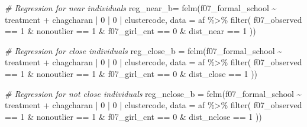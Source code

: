 \documentclass[
]{article}
\newenvironment{Shaded}{\begin{snugshade}}{\end{snugshade}}
\newcommand{\AttributeTok}[1]{\textcolor[rgb]{0.77,0.63,0.00}{#1}}
\newcommand{\CommentTok}[1]{\textcolor[rgb]{0.56,0.35,0.01}{\textit{#1}}}
\newcommand{\DecValTok}[1]{\textcolor[rgb]{0.00,0.00,0.81}{#1}}
\newcommand{\FunctionTok}[1]{\textcolor[rgb]{0.00,0.00,0.00}{#1}}
\newcommand{\NormalTok}[1]{#1}
\newcommand{\OtherTok}[1]{\textcolor[rgb]{0.56,0.35,0.01}{#1}}
\newcommand{\SpecialCharTok}[1]{\textcolor[rgb]{0.00,0.00,0.00}{#1}}
\begin{document}
\begin{Shaded}
\begin{Highlighting}[]
\CommentTok{\# Regression for near individuals}
\NormalTok{reg\_near\_b}\OtherTok{=} \FunctionTok{felm}\NormalTok{(f07\_formal\_school }\SpecialCharTok{\textasciitilde{}}\NormalTok{ treatment }\SpecialCharTok{+} 
\NormalTok{                   chagcharan }\SpecialCharTok{|} \DecValTok{0} \SpecialCharTok{|} \DecValTok{0} \SpecialCharTok{|}\NormalTok{ clustercode,}
         \AttributeTok{data =}\NormalTok{ af }\SpecialCharTok{\%\textgreater{}\%} \FunctionTok{filter}\NormalTok{( }
\NormalTok{                              f07\_observed }\SpecialCharTok{==} \DecValTok{1} \SpecialCharTok{\&}
\NormalTok{                              nonoutlier }\SpecialCharTok{==} \DecValTok{1} \SpecialCharTok{\&}
\NormalTok{                              f07\_girl\_cnt }\SpecialCharTok{==} \DecValTok{0} \SpecialCharTok{\&}
\NormalTok{                              dist\_near }\SpecialCharTok{==} \DecValTok{1}
\NormalTok{                              ))}

\CommentTok{\# Regression for close individuals}
\NormalTok{reg\_close\_b }\OtherTok{=} \FunctionTok{felm}\NormalTok{(f07\_formal\_school }\SpecialCharTok{\textasciitilde{}}\NormalTok{ treatment }\SpecialCharTok{+} 
\NormalTok{                   chagcharan }\SpecialCharTok{|} \DecValTok{0} \SpecialCharTok{|} \DecValTok{0} \SpecialCharTok{|}\NormalTok{ clustercode,}
         \AttributeTok{data =}\NormalTok{ af }\SpecialCharTok{\%\textgreater{}\%} \FunctionTok{filter}\NormalTok{( }
\NormalTok{                              f07\_observed }\SpecialCharTok{==} \DecValTok{1} \SpecialCharTok{\&}
\NormalTok{                              nonoutlier }\SpecialCharTok{==} \DecValTok{1} \SpecialCharTok{\&}
\NormalTok{                              f07\_girl\_cnt }\SpecialCharTok{==} \DecValTok{0} \SpecialCharTok{\&}
\NormalTok{                              dist\_close }\SpecialCharTok{==} \DecValTok{1}
\NormalTok{                              ))}

\CommentTok{\# Regression for not close individuals}
\NormalTok{reg\_nclose\_b }\OtherTok{=} \FunctionTok{felm}\NormalTok{(f07\_formal\_school }\SpecialCharTok{\textasciitilde{}}\NormalTok{ treatment }\SpecialCharTok{+} 
\NormalTok{                   chagcharan }\SpecialCharTok{|} \DecValTok{0} \SpecialCharTok{|} \DecValTok{0} \SpecialCharTok{|}\NormalTok{ clustercode,}
         \AttributeTok{data =}\NormalTok{ af }\SpecialCharTok{\%\textgreater{}\%} \FunctionTok{filter}\NormalTok{( }
\NormalTok{                              f07\_observed }\SpecialCharTok{==} \DecValTok{1} \SpecialCharTok{\&}
\NormalTok{                              nonoutlier }\SpecialCharTok{==} \DecValTok{1} \SpecialCharTok{\&}
\NormalTok{                              f07\_girl\_cnt }\SpecialCharTok{==} \DecValTok{0} \SpecialCharTok{\&}
\NormalTok{                              dist\_nclose }\SpecialCharTok{==} \DecValTok{1}
\NormalTok{                              ))}


\end{Highlighting}
\end{Shaded}
\end{document}
